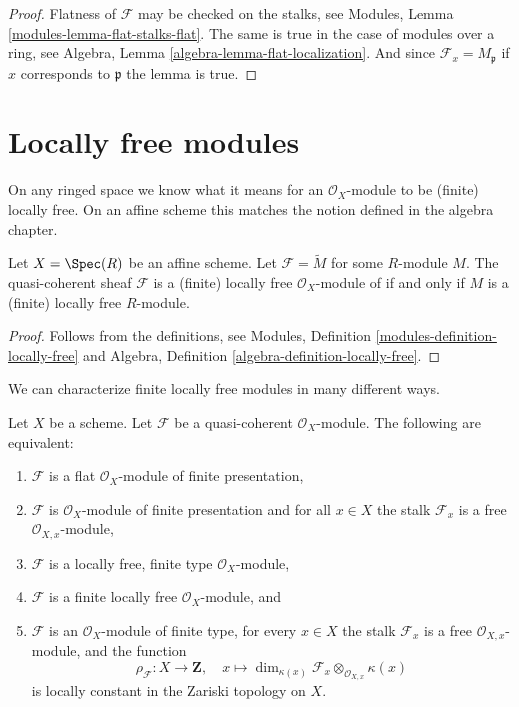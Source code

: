 \begin{proof}
Flatness of $\mathcal{F}$ may be checked on the stalks, see
Modules, Lemma \ref{modules-lemma-flat-stalks-flat}.
The same is true in the case of modules over a ring, see
Algebra, Lemma \ref{algebra-lemma-flat-localization}.
And since $\mathcal{F}_x = M_{\mathfrak p}$ if $x$ corresponds
to $\mathfrak p$ the lemma is true.
\end{proof}





\section{Locally free modules}
\label{section-finite-locally-free}

\noindent
On any ringed space we know what it means for an $\mathcal{O}_X$-module
to be (finite) locally free. On an affine scheme this matches the notion
defined in the algebra chapter.

\begin{lemma}
\label{lemma-locally-free-module}
Let $X = \Spec(R)$ be an affine scheme.
Let $\mathcal{F} = \widetilde{M}$ for some $R$-module $M$.
The quasi-coherent sheaf $\mathcal{F}$ is a (finite) locally free
$\mathcal{O}_X$-module of if and only if $M$ is a (finite)
locally free $R$-module.
\end{lemma}

\begin{proof}
Follows from the definitions, see
Modules, Definition \ref{modules-definition-locally-free}
and
Algebra, Definition \ref{algebra-definition-locally-free}.
\end{proof}

\noindent
We can characterize finite locally free modules in many different ways.

\begin{lemma}
\label{lemma-finite-locally-free}
Let $X$ be a scheme.
Let $\mathcal{F}$ be a quasi-coherent $\mathcal{O}_X$-module.
The following are equivalent:
\begin{enumerate}
\item $\mathcal{F}$ is a flat $\mathcal{O}_X$-module of finite presentation,
\item $\mathcal{F}$ is $\mathcal{O}_X$-module of finite presentation and
for all $x \in X$ the stalk $\mathcal{F}_x$ is a free
$\mathcal{O}_{X, x}$-module,
\item $\mathcal{F}$ is a locally free, finite type $\mathcal{O}_X$-module,
\item $\mathcal{F}$ is a finite locally free $\mathcal{O}_X$-module, and
\item $\mathcal{F}$ is an $\mathcal{O}_X$-module of finite type,
for every $x \in X$ the stalk $\mathcal{F}_x$ is a free
$\mathcal{O}_{X, x}$-module, and the function
$$
\rho_\mathcal{F} : X \to \mathbf{Z}, \quad
x \longmapsto
\dim_{\kappa(x)} \mathcal{F}_x \otimes_{\mathcal{O}_{X, x}} \kappa(x)
$$
is locally constant in the Zariski topology on $X$.
\end{enumerate}
\end{lemma}

